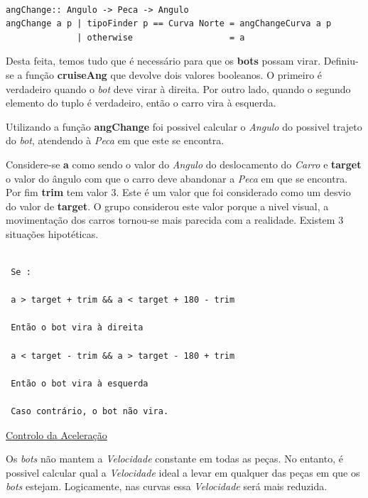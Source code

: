 \documentclass[a4paper]{report} %
\begin{document}
\begin{verbatim}

angChange:: Angulo -> Peca -> Angulo
angChange a p | tipoFinder p == Curva Norte = angChangeCurva a p
              | otherwise                   = a

\end{verbatim}

Desta feita, temos tudo que é necessário para que os \textbf{bots} possam virar. Definiu-se a função \textbf{cruiseAng} que devolve dois valores booleanos. O primeiro é verdadeiro quando o \textit{bot} deve virar à direita. Por outro lado, quando o segundo elemento do tuplo é verdadeiro, então o carro vira à esquerda.

Utilizando a função \textbf{angChange} foi possivel calcular o \emph{Angulo} do possivel trajeto do \textit{bot}, atendendo à \emph{Peca} em que este se encontra.

Considere-se \textbf{a} como sendo o valor do \emph{Angulo} do deslocamento do \emph{Carro} e \textbf{target} o valor do ângulo com que o carro deve abandonar a \emph{Peca} em que se encontra. Por fim \textbf{trim} tem valor 3. Este é um valor que foi considerado como um desvio do valor de \textbf{target}. O grupo considerou este valor porque a nivel visual, a movimentação dos carros tornou-se mais parecida com a realidade.
Existem 3 situações hipotéticas.

\begin{verbatim}

 Se :

 a > target + trim && a < target + 180 - trim

 Então o bot vira à direita

 a < target - trim && a > target - 180 + trim 
 
 Então o bot vira à esquerda

 Caso contrário, o bot não vira.

\end{verbatim}

\newpage

\maketitle\underline{Controlo da Aceleração}

Os \textit{bots} não mantem a \emph{Velocidade} constante em todas as peças. No entanto, é possivel calcular qual a \emph{Velocidade} ideal a levar em qualquer das peças em que os \textit{bots} estejam. Logicamente, nas curvas essa \emph{Velocidade} será mais reduzida. 
\end{document}
